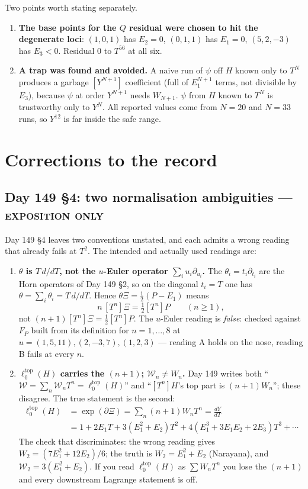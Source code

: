 \documentclass[11pt,a4paper]{article}
\newcommand{\ltop}{\ell^{\mathrm{top}}}
\theoremstyle{plain}
\theoremstyle{definition}
\begin{document}
\noindent Two points worth stating separately.

\begin{enumerate}
\item \textbf{The base points for the $Q$ residual were chosen to hit the degenerate loci}:
$(1,0,1)$ has $E_2=0$, $(0,1,1)$ has $E_1=0$, $(5,2,-3)$ has $E_3<0$. Residual $0$ to
$T^{56}$ at all six.
\item \textbf{A trap was found and avoided.} A naive run of $\psi$ off $H$ known only to
$T^N$ produces a garbage $[Y^{N+1}]$ coefficient (full of $E_1^{N+1}$ terms, not divisible
by $E_3$), because $\psi$ at order $Y^{N+1}$ needs $W_{N+1}$. $\psi$ from $H$ known to $T^N$
is trustworthy only to $Y^N$. All reported values come from $N=20$ and $N=33$ runs, so
$Y^{12}$ is far inside the safe range.
\end{enumerate}

\section{Corrections to the record}
\label{sec:corrections}

\subsection{Day 149 \S4: two normalisation ambiguities --- \textsc{exposition only}}

Day 149 \S4 leaves two conventions unstated, and each admits a wrong reading that already
fails at $T^2$. The intended and actually used readings are:

\begin{enumerate}
\item \textbf{$\theta$ is $T\,d/dT$, not the $u$-Euler operator $\sum_iu_i\partial_{u_i}$.}
The $\theta_i=t_i\partial_{t_i}$ are the Horn operators of Day 149 \S2, so on the diagonal
$t_i=T$ one has $\theta=\sum_i\theta_i=T\,d/dT$. Hence $\theta\Xi=\tfrac12(P-E_1)$ means
\[
n\,[T^n]\Xi=\tfrac12[T^n]P\qquad(n\ge1),
\]
not $(n+1)[T^n]\Xi=\tfrac12[T^n]P$. The $u$-Euler reading is \emph{false}: checked against
$F_P$ built from its definition for $n=1,\dots,8$ at $u=(1,5,11),(2,-3,7),(1,2,3)$ ---
reading A holds on the nose, reading B fails at every $n$.

\item \textbf{$\ltop_0(H)$ carries the $(n+1)$; $\mathcal W_n\neq W_n$.} Day 149 writes both
``$\mathcal W=\sum_n\mathcal W_nT^n=\ltop_0(H)$'' and ``$[T^n]H$'s top part is $(n+1)W_n$'';
these disagree. The true statement is the second:
\begin{align*}
\ltop_0(H)&=\exp(\partial\Xi)=\sum_n(n+1)W_nT^n=\frac{dY}{dT}\\
&=1+2E_1T+3(E_1^2{+}E_2)T^2+4(E_1^3{+}3E_1E_2{+}2E_3)T^3+\cdots
\end{align*}
The check that discriminates: the wrong reading gives $W_2=(7E_1^2+12E_2)/6$; the truth is
$W_2=E_1^2+E_2$ (Narayana), and $\mathcal W_2=3(E_1^2+E_2)$. If you read $\ltop_0(H)$ as
$\sum W_nT^n$ you lose the $(n+1)$ and every downstream Lagrange statement is off.
\end{enumerate}
\end{document}
